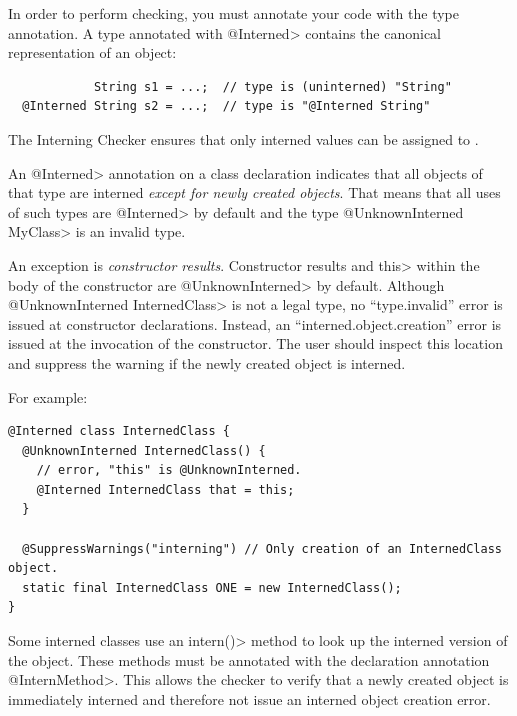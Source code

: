 In order to perform checking, you must annotate your code with the 
type annotation.  A type annotated with \<@Interned> contains the canonical
representation of an
object:

\begin{smaller}
\begin{Verbatim}
            String s1 = ...;  // type is (uninterned) "String"
  @Interned String s2 = ...;  // type is "@Interned String"
\end{Verbatim}
\end{smaller}

The Interning Checker ensures that only interned
values can be assigned to .


An \<@Interned> annotation on a class declaration indicates that all objects of
that type are interned \textit{except for newly created objects}. That means that
all uses of such types are \<@Interned> by default and the type \<@UnknownInterned
MyClass> is an invalid type.

An exception is \textit{constructor results}. Constructor results and \<this> within the
body of the constructor are \<@UnknownInterned> by default. Although \<@UnknownInterned InternedClass>
is not a legal type, no ``type.invalid'' error is issued at constructor declarations.
Instead, an ``interned.object.creation''
error is issued at the invocation of the constructor. The user should inspect
this location and suppress the warning if the newly created object is interned.

For example:

\begin{Verbatim}
@Interned class InternedClass {
  @UnknownInterned InternedClass() {
    // error, "this" is @UnknownInterned.
    @Interned InternedClass that = this;
  }

  @SuppressWarnings("interning") // Only creation of an InternedClass object.
  static final InternedClass ONE = new InternedClass();
}
\end{Verbatim}

Some interned classes use an \<intern()> method to look up the interned version of
the object. These methods must be annotated with the declaration annotation
\<@InternMethod>. This allows the checker to verify that a newly created object
is immediately interned and therefore not issue an interned object creation
error.

